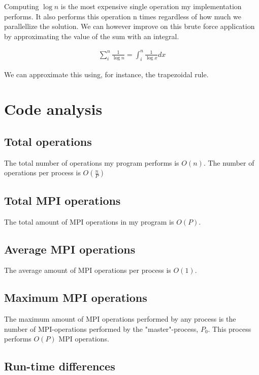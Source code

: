 \documentclass[paper=a4, fontsize=11pt]{scrartcl} %
\numberwithin{equation}{section} %
\numberwithin{figure}{section} %
\numberwithin{table}{section} %
\begin{document}
Computing $\log{n}$ is the most expensive single operation my implementation performs.
It also performs this operation n times regardless of how much we parallellize the solution.
We can however improve on this brute force application by approximating the value of the sum with an integral.

\begin{gather*}
    \sum_{i}^{n} \frac{1}{\log{n}} = \int_{i}^{n} \frac{1}{\log{x}} dx
\end{gather*}

We can approximate this using, for instance, the trapezoidal rule.



\section{Code analysis}

\subsection{Total operations}

The total number of operations my program performs is $O(n)$.
The number of operations per process is $O(\frac{n}{P})$

\subsection{Total MPI operations}

The total amount of MPI operations in my program is $O(P)$.

\subsection{Average MPI operations}

The average amount of MPI operations per process is $O(1)$.

\subsection{Maximum MPI operations}

The maximum amount of MPI operations performed by any process is the number of MPI-operations performed by the "master"-process, $P_0$.
This process performs $O(P)$ MPI operations.

\subsection{Run-time differences}
\end{document}
